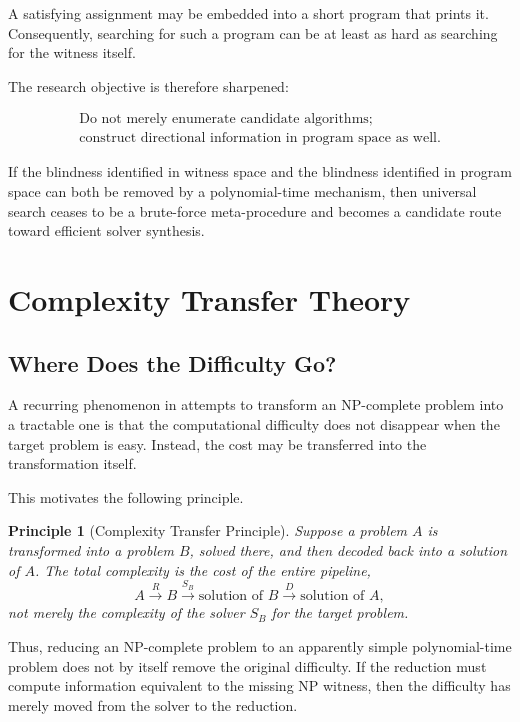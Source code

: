 \documentclass[11pt]{article}
\theoremstyle{plain}
\newtheorem{principle}[theorem]{Principle}
\theoremstyle{definition}
\begin{document}
A satisfying assignment may be embedded into a short program that prints it.
Consequently, searching for such a program can be at least as hard as
searching for the witness itself.

The research objective is therefore sharpened:

\[
\boxed{\begin{gathered}
\text{Do not merely enumerate candidate algorithms;}\\
\text{construct directional information in program space as well.}
\end{gathered}}
\]

If the blindness identified in witness space and the blindness identified in
program space can both be removed by a polynomial-time mechanism, then
universal search ceases to be a brute-force meta-procedure and becomes a
candidate route toward efficient solver synthesis.


\section{Complexity Transfer Theory}
\label{sec:complexity-transfer}

\subsection{Where Does the Difficulty Go?}

A recurring phenomenon in attempts to transform an NP-complete problem into
a tractable one is that the computational difficulty does not disappear when
the target problem is easy.  Instead, the cost may be transferred into the
transformation itself.

This motivates the following principle.

\begin{principle}[Complexity Transfer Principle]
\label{principle:complexity-transfer}
Suppose a problem \(A\) is transformed into a problem \(B\), solved there, and
then decoded back into a solution of \(A\).  The total complexity is the cost
of the entire pipeline,
\[
    A
    \xrightarrow{R}
    B
    \xrightarrow{S_B}
    \text{solution of }B
    \xrightarrow{D}
    \text{solution of }A,
\]
not merely the complexity of the solver \(S_B\) for the target problem.
\end{principle}

Thus, reducing an NP-complete problem to an apparently simple polynomial-time
problem does not by itself remove the original difficulty.  If the reduction
must compute information equivalent to the missing NP witness, then the
difficulty has merely moved from the solver to the reduction.
\end{document}
